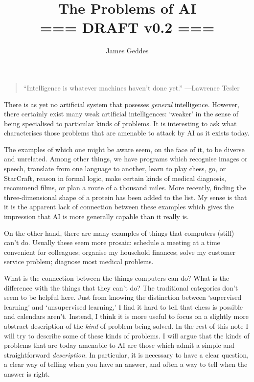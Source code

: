 \documentclass[10pt, a4, twocolumn]{article}
\title{The Problems of AI \\ === DRAFT v0.2 ===}
\author{James Geddes}
\begin{document}
\maketitle
\thispagestyle{empty}\pagestyle{empty}
\begin{quote}
``Intelligence is whatever machines haven't done yet.'' ---Lawrence Tesler
\end{quote}
There is as yet no artificial system that posesses \emph{general}
intelligence. However, there certainly exist many weak artificial intelligences:
`weaker' in the sense of being specialised to particular kinds of problems. It
is interesting to ask what characterises those problems that are amenable to
attack by AI as it exists today.

The examples of which one might be aware seem, on the face of it, to be diverse
and unrelated. Among other things, we have programs which recognise images or
speech, translate from one language to another, learn to play chess, go, or
StarCraft, reason in formal logic, make certain kinds of medical diagnosis,
recommend films, or plan a route of a thousand miles. More recently, finding the
three-dimensional shape of a protein has been added to the list. My sense is
that it is the apparent lack of connection between these examples which gives
the impression that AI is more generally capable than it really is.

On the other hand, there are many examples of things that computers (still)
can't do. Usually these seem more prosaic: schedule a meeting at a time
convenient for colleagues; organise my household finances; solve my customer
service problem; diagnose most medical problems.

What is the connection between the things computers can do? What is the
difference with the things that they can't do? The traditional categories don't
seem to be helpful here. Just from knowing the distinction between `supervised
learning' and `unsupervised learning,' I find it hard to tell that chess is
possible and calendars aren't. Instead, I think it is more useful to focus on a
slightly more abstract description of the \emph{kind} of problem being
solved. In the rest of this note I will try to describe some of these kinds of
problems. I will argue that the kinds of problems that are today amenable to AI
are those which admit a simple and straightforward \emph{description}. In
particular, it is necessary to have a clear question, a clear way of telling
when you have an answer, and often a way to tell when the answer is right. 
\end{document}
